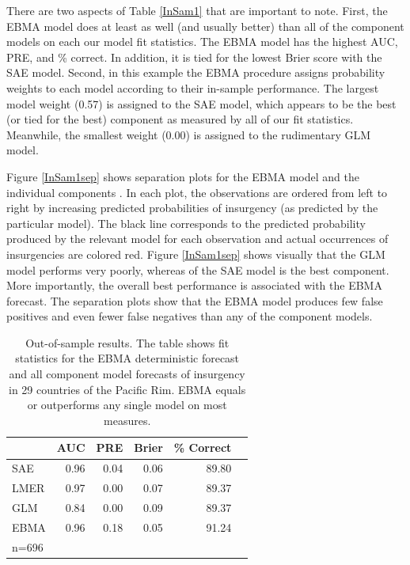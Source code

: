 \documentclass[12pt,fullpage]{article}
\begin{document}
There are two aspects of Table \ref{InSam1} that are important to
note.  First, the EBMA model does at least as well (and usually
better) than all of the component models on each our model fit
statistics.  The EBMA model has the highest AUC, PRE, and \% correct.
In addition, it is tied for the lowest Brier score with the SAE model.
Second, in this example the EBMA procedure assigns probability weights
to each model according to their in-sample performance.  The largest
model weight (0.57) is assigned to the SAE model, which appears to be
the best (or tied for the best) component as measured by all of our
fit statistics. Meanwhile, the smallest weight (0.00) is assigned to
the rudimentary GLM model.

Figure \ref{InSam1sep} shows separation plots for the EBMA model and
the individual components \citep{Greenhill:2011}. In each plot, the
observations are ordered from left to right by increasing predicted
probabilities of insurgency (as predicted by the particular
model). The black line corresponds to the predicted probability
produced by the relevant model for each observation and actual
occurrences of insurgencies are colored red.  Figure \ref{InSam1sep}
shows visually that the GLM model performs very poorly, whereas of the
SAE model is the best component.  More importantly, the overall best
performance is associated with the EBMA forecast. The separation plots
show that the EBMA model produces few false positives and even fewer
false negatives than any of the component models.

\begin{table}[h!]
\small
\begin{center}
  \caption{\footnotesize Out-of-sample results.  The table shows fit
    statistics for the EBMA deterministic forecast and all component
    model forecasts of insurgency in 29 countries of the Pacific Rim.
    EBMA equals or outperforms any single model on most
    measures.}\label{OutSam1}
\begin{tabular}{lrrrrr}
  \toprule
 & AUC & PRE & Brier & \% Correct   \\ 
  \midrule
  SAE &  0.96 & 0.04 & 0.06 & 89.80   \\ 
  LMER & 0.97 & 0.00 & 0.07 & 89.37  \\ 
  GLM & 0.84 & 0.00 & 0.09 & 89.37  \\ 
  EBMA & 0.96 & 0.18 & 0.05 & 91.24 \\ 
   \bottomrule
n=696 \\
\end{tabular}
\end{center}
\end{table}
\end{document}
